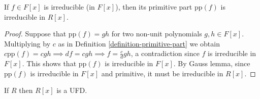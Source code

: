 \begin{lemma}
\label{lemma-irreducible-in-Fx-implies-primitive-part-irreducible}
If $f\in F[x]$ is irreducible (in $F[x]$), then its primitive part
$\text{pp}(f)$ is irreducible in $R[x]$.
\end{lemma}

\begin{proof}
Suppose that $\text{pp}(f)=gh$ for two non-unit polynomials $g,h\in F[x]$.
Multiplying by $c$ as in Definition \ref{definition-primitive-part} we obtain
$c\text{pp}(f)=cgh \implies df=cgh \implies f=\frac{c}{d}gh$, a contradiction
since $f$ is irreducible in $F[x]$. This shows that
$\text{pp}(f)$ is irreducible in $F[x]$. By Gauss lemma, since $\text{pp}(f)$ is
irreducible in $F[x]$ and primitive, it must be irreducible in $R[x]$.
\end{proof}

\begin{lemma}
\label{lemma-Gauss-lemma-corollary}
If $R$ then $R[x]$ is a UFD.
\end{lemma}


